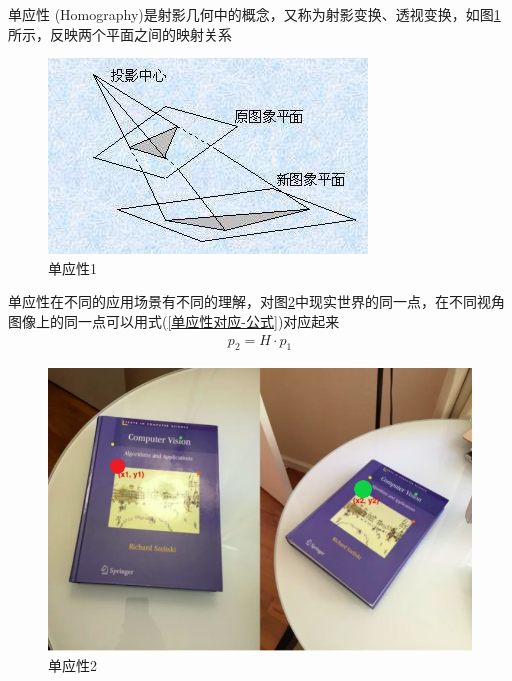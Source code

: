 \documentclass{article}
\begin{document}
单应性 (Homography)是射影几何中的概念，又称为射影变换、透视变换，如图\ref{单应性1}所示，反映两个平面之间的映射关系

\begin{figure}[H]
	\begin{center}
		\includegraphics[scale=0.7]{射影变换}
		\caption{单应性1}
		\label{单应性1}
	\end{center}
\end{figure}

单应性在不同的应用场景有不同的理解，对图\ref{单应性2}中现实世界的同一点，在不同视角图像上的同一点可以用式(\ref{单应性对应-公式})对应起来
\begin{gather}\label{单应性对应-公式}
	p_2=H\cdot p_1
\end{gather}
\begin{figure}[H]
	\begin{center}
		\includegraphics[scale=0.3]{单应性}
		\caption{单应性2}
		\label{单应性2}
	\end{center}
\end{figure}
\end{document}
